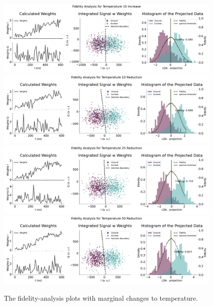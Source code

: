 \begin{figure}[h]
    \centering
    \includegraphics{Simulations/budgets/figures/temperature_10_increase_sme.pdf}
    \includegraphics{Simulations/budgets/figures/temperature_10_reduction_sme.pdf}
    \includegraphics{Simulations/budgets/figures/temperature_25_reduction_sme.pdf}
    \includegraphics{Simulations/budgets/figures/temperature_50_reduction_sme.pdf}
    \caption{The fidelity-analysis plots with marginal changes to temperature.}
    \label{fig:enter-label}
\end{figure}


